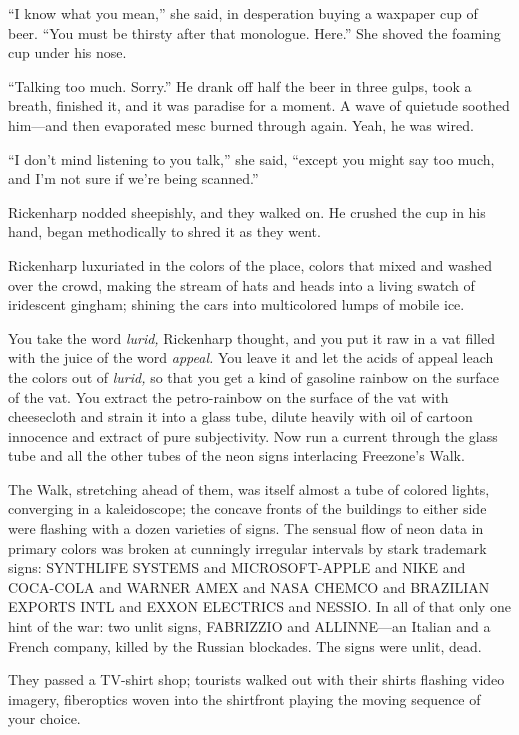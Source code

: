 ``I know what you mean,'' she said, in desperation buying a waxpaper cup of beer. ``You must be thirsty after that monologue. Here.'' She shoved the foaming cup under his nose.

``Talking too much. Sorry.'' He drank off half the beer in three gulps, took a breath, finished it, and it was paradise for a moment. A wave of quietude soothed him---and then evaporated mesc burned through again. Yeah, he was wired.

``I don't mind listening to you talk,'' she said, ``except you might say too much, and I'm not sure if we're being scanned.''

Rickenharp nodded sheepishly, and they walked on. He crushed the cup in his hand, began methodically to shred it as they went.

Rickenharp luxuriated in the colors of the place, colors that mixed and washed over the crowd, making the stream of hats and heads into a living swatch of iridescent gingham; shining the cars into multicolored lumps of mobile ice.

You take the word \textit{lurid,} Rickenharp thought, and you put it raw in a vat filled with the juice of the word \textit{appeal.} You leave it and let the acids of appeal leach the colors out of \textit{lurid,} so that you get a kind of gasoline rainbow on the surface of the vat. You extract the petro-rainbow on the surface of the vat with cheesecloth and strain it into a glass tube, dilute heavily with oil of cartoon innocence and extract of pure subjectivity. Now run a current through the glass tube and all the other tubes of the neon signs interlacing Freezone's Walk.

The Walk, stretching ahead of them, was itself almost a tube of colored lights, converging in a kaleidoscope; the concave fronts of the buildings to either side were flashing with a dozen varieties of signs. The sensual flow of neon data in primary colors was broken at cunningly irregular intervals by stark trademark signs: SYNTHLIFE SYSTEMS and MICROSOFT-APPLE and NIKE and COCA-COLA and WARNER AMEX and NASA CHEMCO and BRAZILIAN EXPORTS INTL and EXXON ELECTRICS and NESSIO. In all of that only one hint of the war: two unlit signs, FABRIZZIO and ALLINNE---an Italian and a French company, killed by the Russian blockades. The signs were unlit, dead.

They passed a TV-shirt shop; tourists walked out with their shirts flashing video imagery, fiberoptics woven into the shirtfront playing the moving sequence of your choice.


